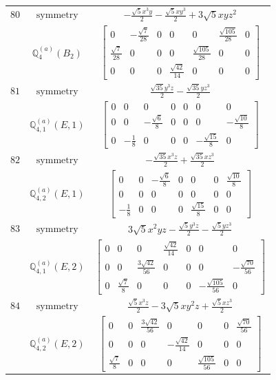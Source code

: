 \documentclass[fleqn,8pt,landscape]{jsarticle}
\begin{document}
\begin{longtable}{ccc}
$ 80 $ & $ \text{symmetry} $ & $ - \frac{\sqrt{5} x^{3} y}{2} - \frac{\sqrt{5} x y^{3}}{2} + 3 \sqrt{5} x y z^{2} $ \\
$  $ & $ \mathbb{Q}_{4}^{(a)}(B_{2}) $ & $ \begin{bmatrix} 0 & - \frac{\sqrt{7}}{28} & 0 & 0 & 0 & \frac{\sqrt{105}}{28} & 0 \\ \frac{\sqrt{7}}{28} & 0 & 0 & 0 & \frac{\sqrt{105}}{28} & 0 & 0 \\ 0 & 0 & 0 & \frac{\sqrt{42}}{14} & 0 & 0 & 0 \end{bmatrix} $ \\ \hline
$ 81 $ & $ \text{symmetry} $ & $ \frac{\sqrt{35} y^{3} z}{2} - \frac{\sqrt{35} y z^{3}}{2} $ \\
$  $ & $ \mathbb{Q}_{4,1}^{(a)}(E,1) $ & $ \begin{bmatrix} 0 & 0 & 0 & 0 & 0 & 0 & 0 \\ 0 & 0 & - \frac{\sqrt{6}}{8} & 0 & 0 & 0 & - \frac{\sqrt{10}}{8} \\ 0 & - \frac{1}{8} & 0 & 0 & 0 & - \frac{\sqrt{15}}{8} & 0 \end{bmatrix} $ \\ \hline
$ 82 $ & $ \text{symmetry} $ & $ - \frac{\sqrt{35} x^{3} z}{2} + \frac{\sqrt{35} x z^{3}}{2} $ \\
$  $ & $ \mathbb{Q}_{4,2}^{(a)}(E,1) $ & $ \begin{bmatrix} 0 & 0 & - \frac{\sqrt{6}}{8} & 0 & 0 & 0 & \frac{\sqrt{10}}{8} \\ 0 & 0 & 0 & 0 & 0 & 0 & 0 \\ - \frac{1}{8} & 0 & 0 & 0 & \frac{\sqrt{15}}{8} & 0 & 0 \end{bmatrix} $ \\ \hline
$ 83 $ & $ \text{symmetry} $ & $ 3 \sqrt{5} x^{2} y z - \frac{\sqrt{5} y^{3} z}{2} - \frac{\sqrt{5} y z^{3}}{2} $ \\
$  $ & $ \mathbb{Q}_{4,1}^{(a)}(E,2) $ & $ \begin{bmatrix} 0 & 0 & 0 & \frac{\sqrt{42}}{14} & 0 & 0 & 0 \\ 0 & 0 & \frac{3 \sqrt{42}}{56} & 0 & 0 & 0 & - \frac{\sqrt{70}}{56} \\ 0 & \frac{\sqrt{7}}{8} & 0 & 0 & 0 & - \frac{\sqrt{105}}{56} & 0 \end{bmatrix} $ \\ \hline
$ 84 $ & $ \text{symmetry} $ & $ \frac{\sqrt{5} x^{3} z}{2} - 3 \sqrt{5} x y^{2} z + \frac{\sqrt{5} x z^{3}}{2} $ \\
$  $ & $ \mathbb{Q}_{4,2}^{(a)}(E,2) $ & $ \begin{bmatrix} 0 & 0 & \frac{3 \sqrt{42}}{56} & 0 & 0 & 0 & \frac{\sqrt{70}}{56} \\ 0 & 0 & 0 & - \frac{\sqrt{42}}{14} & 0 & 0 & 0 \\ \frac{\sqrt{7}}{8} & 0 & 0 & 0 & \frac{\sqrt{105}}{56} & 0 & 0 \end{bmatrix} $ \\ \hline

\end{longtable}
\end{document}
